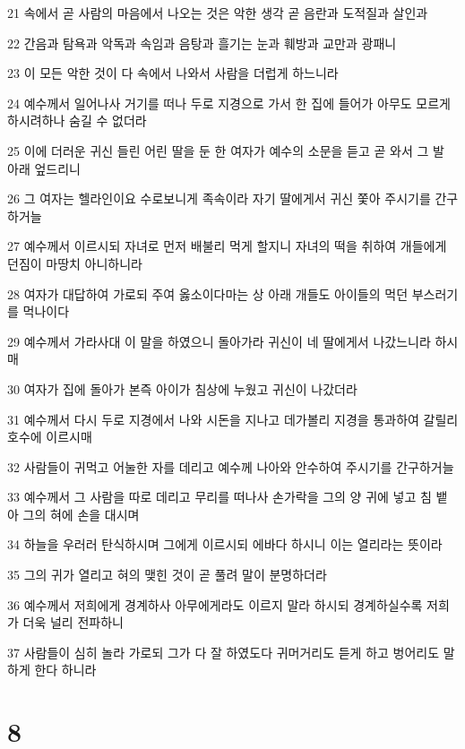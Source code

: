 \par 21 속에서 곧 사람의 마음에서 나오는 것은 악한 생각 곧 음란과 도적질과 살인과
\par 22 간음과 탐욕과 악독과 속임과 음탕과 흘기는 눈과 훼방과 교만과 광패니
\par 23 이 모든 악한 것이 다 속에서 나와서 사람을 더럽게 하느니라
\par 24 예수께서 일어나사 거기를 떠나 두로 지경으로 가서 한 집에 들어가 아무도 모르게 하시려하나 숨길 수 없더라
\par 25 이에 더러운 귀신 들린 어린 딸을 둔 한 여자가 예수의 소문을 듣고 곧 와서 그 발 아래 엎드리니
\par 26 그 여자는 헬라인이요 수로보니게 족속이라 자기 딸에게서 귀신 쫓아 주시기를 간구하거늘
\par 27 예수께서 이르시되 자녀로 먼저 배불리 먹게 할지니 자녀의 떡을 취하여 개들에게 던짐이 마땅치 아니하니라
\par 28 여자가 대답하여 가로되 주여 옳소이다마는 상 아래 개들도 아이들의 먹던 부스러기를 먹나이다
\par 29 예수께서 가라사대 이 말을 하였으니 돌아가라 귀신이 네 딸에게서 나갔느니라 하시매
\par 30 여자가 집에 돌아가 본즉 아이가 침상에 누웠고 귀신이 나갔더라
\par 31 예수께서 다시 두로 지경에서 나와 시돈을 지나고 데가볼리 지경을 통과하여 갈릴리 호수에 이르시매
\par 32 사람들이 귀먹고 어눌한 자를 데리고 예수께 나아와 안수하여 주시기를 간구하거늘
\par 33 예수께서 그 사람을 따로 데리고 무리를 떠나사 손가락을 그의 양 귀에 넣고 침 뱉아 그의 혀에 손을 대시며
\par 34 하늘을 우러러 탄식하시며 그에게 이르시되 에바다 하시니 이는 열리라는 뜻이라
\par 35 그의 귀가 열리고 혀의 맺힌 것이 곧 풀려 말이 분명하더라
\par 36 예수께서 저희에게 경계하사 아무에게라도 이르지 말라 하시되 경계하실수록 저희가 더욱 널리 전파하니
\par 37 사람들이 심히 놀라 가로되 그가 다 잘 하였도다 귀머거리도 듣게 하고 벙어리도 말하게 한다 하니라

\chapter{8}

